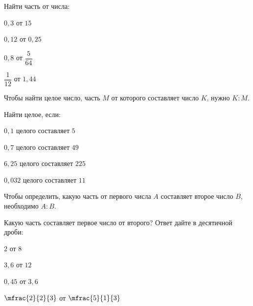 \begin{class}[number=1]
\begin{definit}
	\end{definit}
	\begin{listofex}[resume]
		\item Найти часть от числа:
		\begin{enumcols}[itemcolumns=4]
			\item \( 0,3 \) от \( 15 \)
			\item \( 0,12 \) от \( 0,25 \)
			\item \( 0,8 \) от \( \dfrac{5}{64} \)
			\item \( \dfrac{1}{12} \) от \( 1,44 \)
		\end{enumcols}
	\end{listofex}
	\begin{definit}
	Чтобы найти целое число, часть \( M \) от которого составляет число \( K \), нужно \( K:M \).
	\end{definit}
	\begin{listofex}[resume]
		\item Найти целое, если:
		\begin{enumcols}[itemcolumns=2]
			\item \( 0,1 \) целого составляет \( 5 \)
			\item \( 0,7 \) целого составляет \( 49 \)
			\item \( 6,25 \) целого составляет \( 225 \)
			\item \( 0,032 \) целого составляет \( 11 \)
		\end{enumcols}
	\end{listofex}
	\begin{definit}
		Чтобы определить, какую часть от первого числа \( A \) составляет второе число \( B \), необходимо \( A:B \).
	\end{definit}
	\begin{listofex}[resume]
		\item Какую часть составляет первое число от второго? Ответ дайте в десятичной дроби:
		\begin{enumcols}[itemcolumns=4]
			\item \( 2 \) от \( 8 \)
			\item \( 3,6 \) от \( 12 \)
			\item \( 0,45 \) от \( 3,6 \)
			\item \( \mfrac{2}{2}{3} \) от \( \mfrac{5}{1}{3} \)
		\end{enumcols}
	\end{listofex}
	
\end{class}
%
